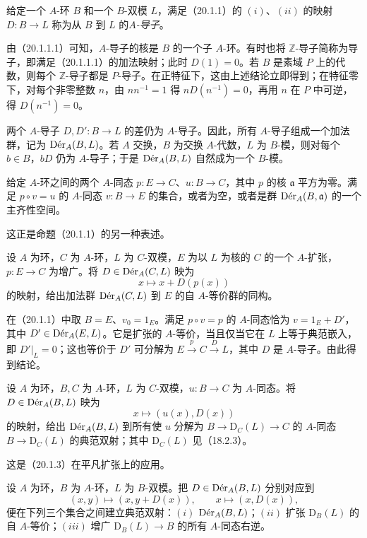给定一个 $A$-环 $B$ 和一个 $B$-双模 $L$，满足（20.1.1）的 $(i)$、$(ii)$ 的映射 $D:B\to L$ 称为从 $B$ 到 $L$ 的\emph{$A$-导子}。

由（20.1.1.1）可知，$A$-导子的核是 $B$ 的一个子 $A$-环。有时也将 $\mathbb Z$-导子简称为导子，即满足（20.1.1.1）的加法映射；此时 $D(1)=0$。若 $B$ 是素域 $P$ 上的代数，则每个 $\mathbb Z$-导子都是 $P$-导子。在正特征下，这由上述结论立即得到；在特征零下，对每个非零整数 $n$，由 $n n^{-1}=1$ 得 $nD(n^{-1})=0$，再用 $n$ 在 $P$ 中可逆，得 $D(n^{-1})=0$。

两个 $A$-导子 $D,D':B\to L$ 的差仍为 $A$-导子。因此，所有 $A$-导子组成一个加法群，记为 $\Der_A(B,L)$。若 $A$ 交换，$B$ 为交换 $A$-代数，$L$ 为 $B$-模，则对每个 $b\in B$，$bD$ 仍为 $A$-导子；于是 $\Der_A(B,L)$ 自然成为一个 $B$-模。

给定 $A$-环之间的两个 $A$-同态 $p:E\to C$、$u:B\to C$，其中 $p$ 的核 $\mathfrak a$ 平方为零。满足 $p\circ v=u$ 的 $A$-同态 $v:B\to E$ 的集合，或者为空，或者是群 $\Der_A(B,\mathfrak a)$ 的一个主齐性空间。

这正是命题（20.1.1）的另一种表述。

设 $A$ 为环，$C$ 为 $A$-环，$L$ 为 $C$-双模，$E$ 为以 $L$ 为核的 $C$ 的一个 $A$-扩张，$p:E\to C$ 为增广。将 $D\in\Der_A(C,L)$ 映为
\[
 x\longmapsto x+D(p(x))
\]
的映射，给出加法群 $\Der_A(C,L)$ 到 $E$ 的自 $A$-等价群的同构。

在（20.1.1）中取 $B=E$、$v_0=1_E$。满足 $p\circ v=p$ 的 $A$-同态恰为 $v=1_E+D'$，其中 $D'\in\Der_A(E,L)$。它是扩张的 $A$-等价，当且仅当它在 $L$ 上等于典范嵌入，即 $D'|_L=0$；这也等价于 $D'$ 可分解为 $E\xrightarrow{p}C\xrightarrow{D}L$，其中 $D$ 是 $A$-导子。由此得到结论。

设 $A$ 为环，$B,C$ 为 $A$-环，$L$ 为 $C$-双模，$u:B\to C$ 为 $A$-同态。将 $D\in\Der_A(B,L)$ 映为
\[
 x\longmapsto (u(x),D(x))
\]
的映射，给出 $\Der_A(B,L)$ 到所有使 $u$ 分解为 $B\to\mathrm D_C(L)\to C$ 的 $A$-同态 $B\to\mathrm D_C(L)$ 的典范双射；其中 $\mathrm D_C(L)$ 见（18.2.3）。

这是（20.1.3）在平凡扩张上的应用。

设 $A$ 为环，$B$ 为 $A$-环，$L$ 为 $B$-双模。把 $D\in\Der_A(B,L)$ 分别对应到
\[
 (x,y)\longmapsto(x,y+D(x)),\qquad x\longmapsto(x,D(x)),
\]
便在下列三个集合之间建立典范双射：$(i)$ $\Der_A(B,L)$；$(ii)$ 扩张 $\mathrm D_B(L)$ 的自 $A$-等价；$(iii)$ 增广 $\mathrm D_B(L)\to B$ 的所有 $A$-同态右逆。

